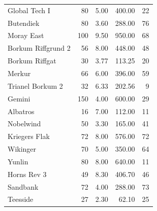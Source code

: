 \documentclass[wes, manuscript]{copernicus}
\begin{document}
\begin{table}
\begin{tabular}{lrrrr}
      Global Tech I &                  80 &                 5.00 &              400.00 &                                 22 \\
          Butendiek &                  80 &                 3.60 &              288.00 &                                 76 \\
         Moray East &                 100 &                 9.50 &              950.00 &                                 68 \\
 Borkum Riffgrund 2 &                  56 &                 8.00 &              448.00 &                                 48 \\
      Borkum Riﬀgat &                  30 &                 3.77 &              113.25 &                                 20 \\
             Merkur &                  66 &                 6.00 &              396.00 &                                 59 \\
   Trianel Borkum 2 &                  32 &                 6.33 &              202.56 &                                  9 \\
             Gemini &                 150 &                 4.00 &              600.00 &                                 29 \\
           Albatros &                  16 &                 7.00 &              112.00 &                                 11 \\
          Nobelwind &                  50 &                 3.30 &              165.00 &                                 41 \\
      Kriegers Flak &                  72 &                 8.00 &              576.00 &                                 72 \\
           Wikinger &                  70 &                 5.00 &              350.00 &                                 64 \\
             Yunlin &                  80 &                 8.00 &              640.00 &                                 11 \\
        Horns Rev 3 &                  49 &                 8.30 &              406.70 &                                 46 \\
           Sandbank &                  72 &                 4.00 &              288.00 &                                 73 \\
           Teesside &                  27 &                 2.30 &               62.10 &                                 25 \\

\end{tabular}
\end{table}
\end{document}
